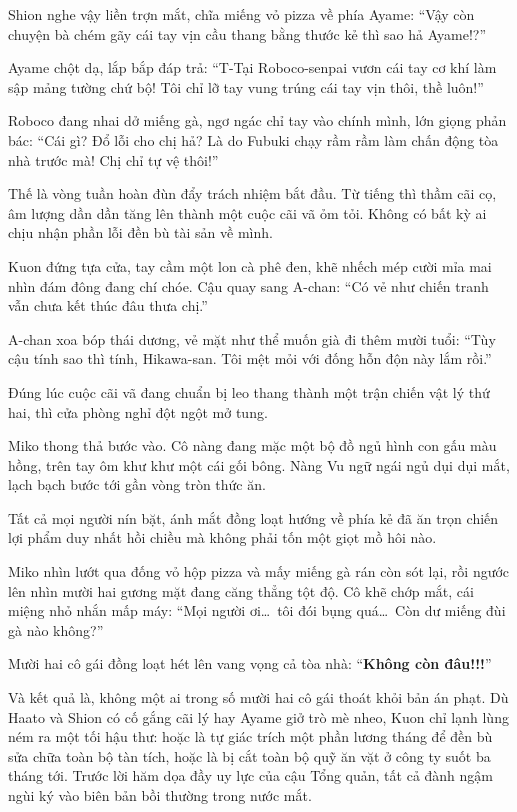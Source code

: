 \documentclass[../main.tex]{subfiles}
\begin{document}
Shion nghe vậy liền trợn mắt, chĩa miếng vỏ pizza về phía Ayame:
``Vậy còn chuyện bà chém gãy cái tay vịn cầu thang bằng thước kẻ thì sao hả Ayame!?''

Ayame chột dạ, lắp bắp đáp trả:
``T-Tại Roboco-senpai vươn cái tay cơ khí làm sập mảng tường chứ bộ! Tôi chỉ lỡ tay vung trúng cái tay vịn thôi, thề luôn!''

Roboco đang nhai dở miếng gà, ngơ ngác chỉ tay vào chính mình, lớn giọng phản bác:
``Cái gì? Đổ lỗi cho chị hả? Là do Fubuki chạy rầm rầm làm chấn động tòa nhà trước mà! Chị chỉ tự vệ thôi!''

Thế là vòng tuần hoàn đùn đẩy trách nhiệm bắt đầu. Từ tiếng thì thầm cãi cọ, âm lượng dần dần tăng lên thành một cuộc cãi vã ỏm tỏi. Không có bất kỳ ai chịu nhận phần lỗi đền bù tài sản về mình.

Kuon đứng tựa cửa, tay cầm một lon cà phê đen, khẽ nhếch mép cười mỉa mai nhìn đám đông đang chí chóe. Cậu quay sang A-chan:
``Có vẻ như chiến tranh vẫn chưa kết thúc đâu thưa chị.''

A-chan xoa bóp thái dương, vẻ mặt như thể muốn già đi thêm mười tuổi:
``Tùy cậu tính sao thì tính, Hikawa-san. Tôi mệt mỏi với đống hỗn độn này lắm rồi.''

Đúng lúc cuộc cãi vã đang chuẩn bị leo thang thành một trận chiến vật lý thứ hai, thì cửa phòng nghỉ đột ngột mở tung.

Miko thong thả bước vào. Cô nàng đang mặc một bộ đồ ngủ hình con gấu màu hồng, trên tay ôm khư khư một cái gối bông. Nàng Vu ngữ ngái ngủ dụi dụi mắt, lạch bạch bước tới gần vòng tròn thức ăn.

Tất cả mọi người nín bặt, ánh mắt đồng loạt hướng về phía kẻ đã ăn trọn chiến lợi phẩm duy nhất hồi chiều mà không phải tốn một giọt mồ hôi nào.

Miko nhìn lướt qua đống vỏ hộp pizza và mấy miếng gà rán còn sót lại, rồi ngước lên nhìn mười hai gương mặt đang căng thẳng tột độ. Cô khẽ chớp mắt, cái miệng nhỏ nhắn mấp máy:
``Mọi người ơi\dots\ tôi đói bụng quá\dots\ Còn dư miếng đùi gà nào không?''

Mười hai cô gái đồng loạt hét lên vang vọng cả tòa nhà: ``\textbf{Không còn đâu!!!}''

Và kết quả là, không một ai trong số mười hai cô gái thoát khỏi bản án phạt. Dù Haato và Shion có cố gắng cãi lý hay Ayame giở trò mè nheo, Kuon chỉ lạnh lùng ném ra một tối hậu thư: hoặc là tự giác trích một phần lương tháng để đền bù sửa chữa toàn bộ tàn tích, hoặc là bị cắt toàn bộ quỹ ăn vặt ở công ty suốt ba tháng tới. Trước lời hăm dọa đầy uy lực của cậu Tổng quản, tất cả đành ngậm ngùi ký vào biên bản bồi thường trong nước mắt.
\end{document}
